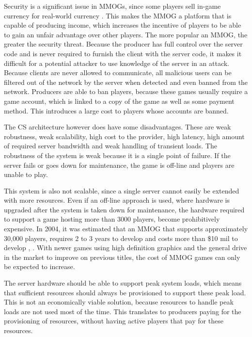 \documentclass[journal,oneside,a4paper,onecolumn]{IEEEtran}
\begin{document}
Security is a significant issue in MMOGs, since some players sell in-game currency for real-world currency \cite{chinese_gold_farmer}. This makes the MMOG a platform that is capable of producing income, which increases the incentive of players to be able to gain an unfair advantage over other players. The more popular an MMOG, the greater the security threat. Because the producer has full control over the server code and is never required to furnish the client with the server code, it makes it difficult for a potential attacker to use knowledge of the server in an attack. Because clients are never allowed to communicate, all malicious users can be filtered out of the network by the server when detected and even banned from the network. Producers are able to ban players, because these games usually require a game account, which is linked to a copy of the game as well as some payment method. This introduces a large cost to players whose accounts are banned.

The \ac{CS} architecture however does have some disadvantages. These are weak robustness, weak scalability, high cost to the provider, high latency, high amount of required server bandwidth and weak handling of transient loads. The robustness of the system is weak because it is a single point of failure. If the server fails or goes down for maintenance, the game is off-line and players are unable to play.

This system is also not scalable, since a single server cannot easily be extended with more resources. Even if an off-line approach is used, where hardware is upgraded after the system is taken down for maintenance, the hardware required to support a game hosting more than 3000 players, become prohibitively expensive. In 2004, it was estimated that an MMOG that supports approximately 30,000 players, requires 2 to 3 years to develop and costs more than \$10 mil to develop \cite{cs_mmog_cost}, \cite{igda_online_whitepaper}. With newer games using high definition graphics and the general drive in the market to improve on previous titles, the cost of MMOG games can only be expected to increase.

The server hardware should be able to support peak system loads, which means that sufficient resources should always be provisioned to support these peak load. This is not an economically viable solution, because resources to handle peak loads are not used most of the time. This translates to producers paying for the provisioning of resources, without having active players that pay for these resources.
\end{document}
